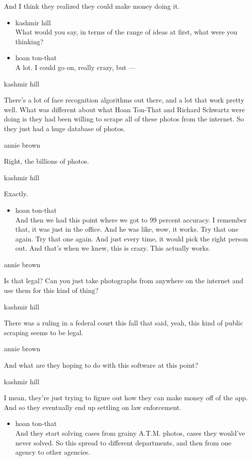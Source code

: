 And I think they realized they could make money doing it.

\begin{itemize}
\item
  kashmir hill\\
  What would you say, in terms of the range of ideas at first, what were
  you thinking?
\item
  hoan ton-that\\
  A lot. I could go on, really crazy, but ---
\end{itemize}

kashmir hill

There's a lot of face recognition algorithms out there, and a lot that
work pretty well. What was different about what Hoan Ton-That and
Richard Schwartz were doing is they had been willing to scrape all of
these photos from the internet. So they just had a huge database of
photos.

annie brown

Right, the billions of photos.

kashmir hill

Exactly.

\begin{itemize}
\tightlist
\item
  hoan ton-that\\
  And then we had this point where we got to 99 percent accuracy. I
  remember that, it was just in the office. And he was like, wow, it
  works. Try that one again. Try that one again. And just every time, it
  would pick the right person out. And that's when we knew, this is
  crazy. This actually works.
\end{itemize}

annie brown

Is that legal? Can you just take photographs from anywhere on the
internet and use them for this kind of thing?

kashmir hill

There was a ruling in a federal court this fall that said, yeah, this
kind of public scraping seems to be legal.

annie brown

And what are they hoping to do with this software at this point?

kashmir hill

I mean, they're just trying to figure out how they can make money off of
the app. And so they eventually end up settling on law enforcement.

\begin{itemize}
\tightlist
\item
  hoan ton-that\\
  And they start solving cases from grainy A.T.M. photos, cases they
  would've never solved. So this spread to different departments, and
  then from one agency to other agencies.
\end{itemize}

